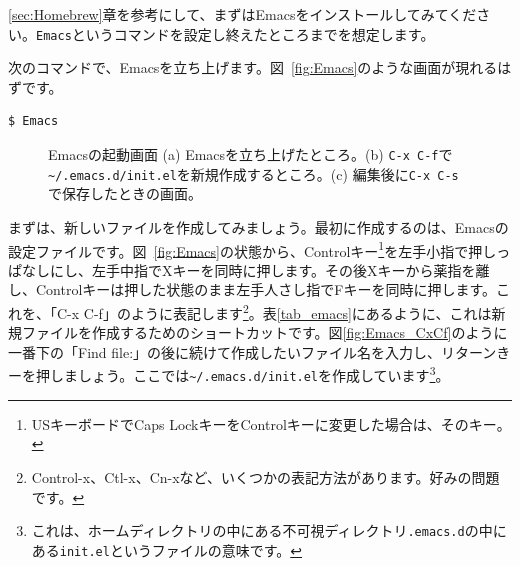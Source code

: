 \ref{sec:Homebrew}章を参考にして、まずはEmacsをインストールしてみてください。\texttt{Emacs}というコマンドを設定し終えたところまでを想定します。

次のコマンドで、Emacsを立ち上げます。図~\ref{fig:Emacs}のような画面が現れるはずです。
\begin{lstlisting}[language=bash]
$ Emacs
\end{lstlisting}

\begin{figure}
  \centering
  \hfill%
  \hfill%
  \caption{Emacsの起動画面 (a) Emacsを立ち上げたところ。(b) \texttt{C-x C-f}で\texttt{\~{}/.emacs.d/init.el}を新規作成するところ。(c) 編集後に\texttt{C-x C-s}で保存したときの画面。}
\end{figure}

まずは、新しいファイルを作成してみましょう。最初に作成するのは、Emacsの設定ファイルです。図~\ref{fig:Emacs}の状態から、Controlキー\footnote{USキーボードでCaps LockキーをControlキーに変更した場合は、そのキー。}を左手小指で押しっぱなしにし、左手中指でXキーを同時に押します。その後Xキーから薬指を離し、Controlキーは押した状態のまま左手人さし指でFキーを同時に押します。これを、「C-x C-f」のように表記します\footnote{Control-x、Ctl-x、Cn-xなど、いくつかの表記方法があります。好みの問題です。}。表\ref{tab_emacs}にあるように、これは新規ファイルを作成するためのショートカットです。図\ref{fig:Emacs_CxCf}のように一番下の「Find file:」の後に続けて作成したいファイル名を入力し、リターンきーを押しましょう。ここでは\texttt{\~{}/.emacs.d/init.el}を作成しています\footnote{これは、ホームディレクトリの中にある不可視ディレクトリ\texttt{.emacs.d}の中にある\texttt{init.el}というファイルの意味です。}。

